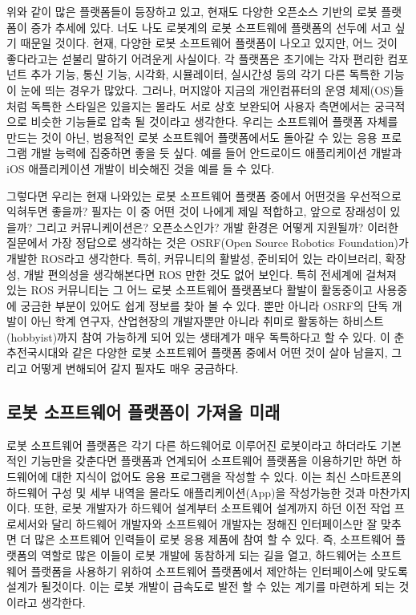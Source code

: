 위와 같이 많은 플랫폼들이 등장하고 있고, 현재도 다양한 오픈소스 기반의 로봇 플랫폼이 증가 추세에 있다.
너도 나도 로봇계의 로봇 소프트웨에 플랫폼의 선두에 서고 싶기 때문일 것이다.
현재, 다양한 로봇 소프트웨어 플랫폼이 나오고 있지만, 어느 것이 좋다라고는 섣불리 말하기 어려운게 사실이다.
각 플랫폼은 초기에는 각자 편리한 컴포넌트 추가 기능, 통신 기능, 시각화, 시뮬레이터, 실시간성 등의 각기 다른 독특한 기능이 눈에 띄는 경우가 많았다.
그러나, 머지않아 지금의 개인컴퓨터의 운영 체제(OS)들처럼 독특한 스타일은 있을지는 몰라도 서로 상호 보완되어 사용자 측면에서는 궁극적으로 비슷한 기능들로 압축 될 것이라고 생각한다.
우리는 소프트웨어 플랫폼 자체를 만드는 것이 아닌, 범용적인 로봇 소프트웨어 플랫폼에서도 돌아갈 수 있는 응용 프로그램 개발 능력에 집중하면 좋을 듯 싶다.
예를 들어 안드로이드 애플리케이션 개발과 iOS 애플리케이션 개발이 비슷해진 것을 예를 들 수 있다. 

그렇다면 우리는 현재 나와있는 로봇 소프트웨어 플랫폼 중에서 어떤것을 우선적으로 익혀두면 좋을까?
필자는 이 중 어떤 것이 나에게 제일 적합하고, 앞으로 장래성이 있을까?
그리고 커뮤니케이션은?
오픈소스인가?
개발 환경은 어떻게 지원될까?
이러한 질문에서 가장 정답으로 생각하는 것은 OSRF(Open Source Robotics Foundation)가 개발한 ROS라고 생각한다.
특히, 커뮤니티의 활발성, 준비되어 있는 라이브러리, 확장성, 개발 편의성을 생각해본다면 ROS 만한 것도 없어 보인다.
특히 전세계에 걸쳐져 있는 ROS 커뮤니티는 그 어느 로봇 소프트웨어 플랫폼보다 활발이 활동중이고 사용중에 궁금한 부분이 있어도 쉽게 정보를 찾아 볼 수 있다.
뿐만 아니라 OSRF의 단독 개발이 아닌 학계 연구자, 산업현장의 개발자뿐만 아니라 취미로 활동하는 하비스트(hobbyist)까지 참여 가능하게 되어 있는 생태계가 매우 독특하다고 할 수 있다.  
이 춘추전국시대와 같은 다양한 로봇 소프트웨어 플랫폼 중에서 어떤 것이 살아 남을지, 그리고 어떻게 변해되어 갈지 필자도 매우 궁금하다.

\subsection{로봇 소프트웨어 플랫폼이 가져올 미래}

로봇 소프트웨어 플랫폼은 각기 다른 하드웨어로 이루어진 로봇이라고 하더라도 기본적인 기능만을 갖춘다면 플랫폼과 연계되어 소프트웨어 플랫폼을 이용하기만 하면 하드웨어에 대한 지식이 없어도 응용 프로그램을 작성할 수 있다.
이는 최신 스마트폰의 하드웨어 구성 및 세부 내역을 몰라도 애플리케이션(App)을 작성가능한 것과 마찬가지이다.
또한, 로봇 개발자가 하드웨어 설계부터 소프트웨어 설계까지 하던 이전 작업 프로세서와 달리 하드웨어 개발자와 소프트웨어 개발자는 정해진 인터페이스만 잘 맞추면 더 많은 소프트웨어 인력들이 로봇 응용 제품에 참여 할 수 있다.
즉, 소프트웨어 플랫폼의 역할로 많은 이들이 로봇 개발에 동참하게 되는 길을 열고, 하드웨어는 소프트웨어 플랫폼을 사용하기 위하여 소프트웨어 플랫폼에서 제안하는 인터페이스에 맞도록 설계가 될것이다.
이는 로봇 개발이 급속도로 발전 할 수 있는 계기를 마련하게 되는 것이라고 생각한다.


